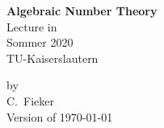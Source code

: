 
\begin{titlepage}
\vspace*{6cm}
\begin{center} 
   {\Huge\bf Algebraic Number Theory} \\ [0.8cm]
     \Large  Lecture in \\
     Sommer 2020 \\ 
     TU-Kaiserslautern
\end{center}
\vspace*{2cm}
\begin{center} \normalsize by \\
   C.~Fieker\\
   Version of \today
\end{center}
\end{titlepage}
\newpage

\setcounter{page}{0}
\thispagestyle{empty}
$\phantom{leere Seite bzw. dummy Seite}$
\newpage


